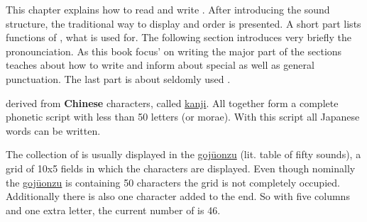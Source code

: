 
%
%

This chapter explains how to read and write \jkanavoc. After introducing the
sound structure, the traditional way to display and order \jtopic is
presented. A short part lists functions of \jtopic, what \jtopic
is used for. The following section introduces very briefly the pronounciation.
As this book focus' on writing the major part of the sections teaches
about how to write \jtopic and inform about special \jtopic as well as general
punctuation. The last part is about seldomly used \jtopic.


\jscript{} derived from \textbf{Chinese} characters, called
\hyperref[sec:Kanji]{kanji}. All \jtopic{} together form a complete phonetic
script with less than 50 letters (or morae). With this script all Japanese
words can be written.


The collection of \textbf{\jtopic} is usually displayed in the
\hyperref[sec:Gojuonzu]{gojūonzu} (lit. table of fifty sounds), a grid of 10x5
fields in which the characters are displayed. Even though nominally the
\hyperref[sec:Gojuonzu]{gojūonzu} is containing 50 characters the grid is not
completely occupied. Additionally there is also one character added to the end.
So with five columns and one extra letter, the current number of
\textbf{\jtopic} is 46. %
%
%

